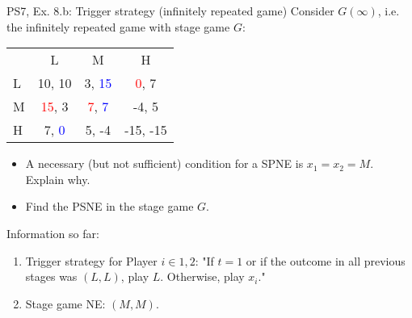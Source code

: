 \begin{frame}{PS7, Ex. 8.b: Trigger strategy (infinitely repeated game)}
    Consider $G(\infty)$, i.e. the infinitely repeated game with stage game $G$: \vspace{-6pt}
    \begin{table}
      \begin{tabular}{l|c|c|c|}
        \multicolumn{1}{c}{} & \multicolumn{1}{c}{L} & \multicolumn{1}{c}{M} & \multicolumn{1}{c}{H} \\\cline{2-4}
        L & 10, 10 & 3, \textcolor{blue}{15} & \textcolor{red}{0}, 7 \\\cline{2-4}
        M & \textcolor{red}{15}, 3 & \textcolor{red}{7}, \textcolor{blue}{7} & -4, 5 \\\cline{2-4}
        H & 7, \textcolor{blue}{0} & 5, -4 & -15, -15 \\\cline{2-4}
      \end{tabular}
    \end{table}
    \begin{itemize}
      \item[(b)] A necessary (but not sufficient) condition for a SPNE is $x_1 = x_2 = M$. Explain why.
    \end{itemize}
  \begin{multicols}{2}
    \begin{itemize}
      \item[(Step a)] Find the PSNE in the stage game $G$.
    \end{itemize}
    \vfill\null\columnbreak
    Information so far:
    \begin{enumerate}
      \item Trigger strategy for Player $i\in1,2$: "If $t=1$ or if the outcome in all previous stages was $(L,L)$, play $L$. Otherwise, play $x_i$."
      \item Stage game NE: $(M,M)$.
    \end{enumerate}
    \vfill\null
  \end{multicols}
\end{frame}
